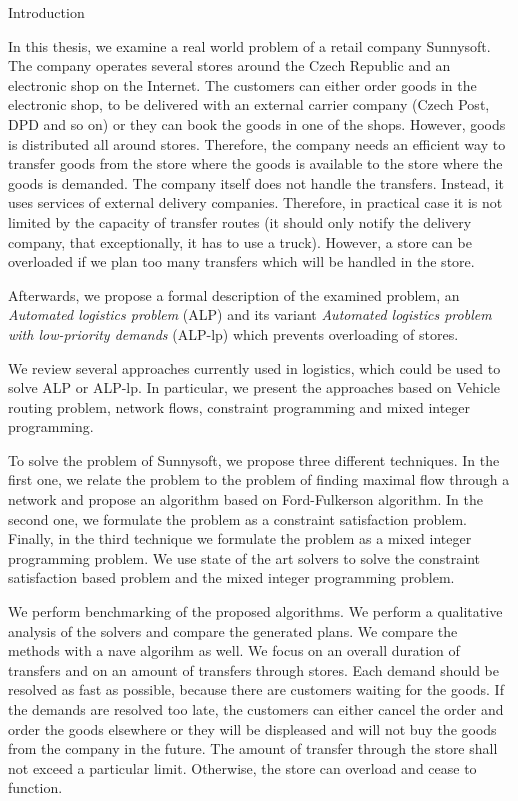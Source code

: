 \newpage
\chap Introduction

In this thesis, we examine a real world problem of a retail company Sunnysoft. The company operates several stores around the Czech Republic and an electronic shop on the Internet.
The customers can either order goods in the electronic shop, to be delivered with an external carrier company (Czech Post, DPD and so on) or they can book the goods in one of the shops.
However, goods is distributed all around stores. Therefore, the company needs an efficient way to transfer goods from the store where the goods is available to the store where the goods
is demanded. The company itself does not handle the transfers. Instead, it uses services of external delivery companies. Therefore, in practical case it is not limited by the capacity of transfer 
routes (it should only notify the delivery company, that exceptionally, it has to use a truck). However, a store can be overloaded if we plan too many transfers which will be handled 
in the store. 

Afterwards, we propose a formal description of the examined problem, an {\em Automated logistics problem} (ALP) and its variant {\em Automated logistics problem with low-priority demands} (ALP-lp) which 
prevents overloading of stores.

We review several approaches currently used in logistics, which could be used to solve ALP or ALP-lp. In particular, we present the approaches based on Vehicle routing problem, network flows,
constraint programming and mixed integer programming.

To solve the problem of Sunnysoft, we propose three different techniques. In the first one, we relate the problem to the problem of finding maximal flow through a network and propose an algorithm based
on Ford-Fulkerson algorithm. In the second one, we formulate the problem as a constraint satisfaction problem. Finally, in the third technique we formulate the problem as a mixed integer programming 
problem. We use state of the art solvers to solve the constraint satisfaction based problem and the mixed integer programming problem.

We perform benchmarking of the proposed algorithms. We perform a qualitative analysis of the solvers and compare the generated plans. We compare the methods with a na\I ve algorihm as well. We focus on an overall duration of transfers and on an amount of transfers through stores. Each demand should be resolved as fast
as possible, because there are customers waiting for the goods. If the demands are resolved too late, the customers can either cancel the order and order the goods elsewhere or they will be
displeased and will not buy the goods from the company in the future. The amount of transfer through the store shall not exceed a particular limit. Otherwise, the store can overload and cease to function.

